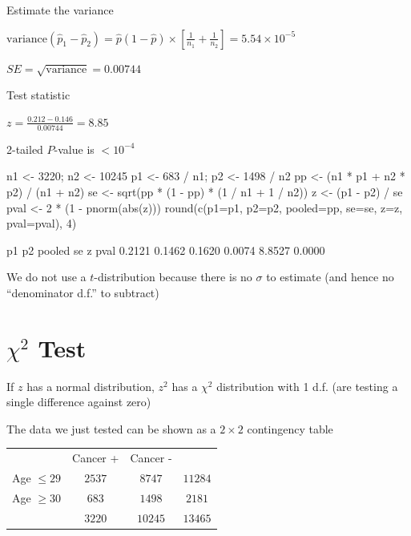 \item Estimate the variance
  \bi
  \item $\mathrm{variance}(\hat{p}_{1}-\hat{p}_{2}) = \hat{p}(1-\hat{p})\times \left[\frac{1}{n_{1}}+\frac{1}{n_{2}}\right] = 5.54 \times 10^{-5}$ \\
  \item $SE = \sqrt{\mathrm{variance}} = 0.00744$ \\
  \ei
\item Test statistic
  \bi 
  \item $z = \frac{0.212-0.146}{0.00744} = 8.85$
  \ei
\item 2-tailed $P$-value is $ < 10^{-4}$
\begin{Schunk}
\begin{Sinput}
n1 <- 3220;     n2 <- 10245
p1 <- 683 / n1; p2 <- 1498 / n2
pp <- (n1 * p1 + n2 * p2) / (n1 + n2)
se <- sqrt(pp * (1 - pp) * (1 / n1 + 1 / n2))
z  <- (p1 - p2) / se
pval <- 2 * (1 - pnorm(abs(z)))
round(c(p1=p1, p2=p2, pooled=pp, se=se, z=z, pval=pval), 4)
\end{Sinput}
\begin{Soutput}
    p1     p2 pooled     se      z   pval 
0.2121 0.1462 0.1620 0.0074 8.8527 0.0000 
\end{Soutput}
\end{Schunk}
\item We do not use a $t$-distribution because there is no $\sigma$ to
  estimate (and hence no ``denominator d.f.'' to subtract)
\ei

\section{$\chi^2$ Test}
\bi
\item If $z$ has a normal distribution, $z^2$ has a $\chi^2$
  distribution with 1 d.f. (are testing a single difference against zero)
\item The data we just tested can be shown as a $2\times 2$
  contingency table

\begin{tabular}{l|c|c|c} 
\multicolumn{1}{l}{} & \multicolumn{1}{c}{Cancer +} & \multicolumn{1}{l}{Cancer -} \\ \cline{2-3}
Age $\leq 29$ & $2537 $ & $8747$ & $11284$ \\ \cline{2-3}
Age $\geq 30$ & $683$ & $1498$ &  $2181$ \\ \cline{2-3}
\multicolumn{1}{l}{} & \multicolumn{1}{c}{$3220$} & \multicolumn{1}{c}{$10245$} & \multicolumn{1}{c}{$13465$}
\end{tabular}


